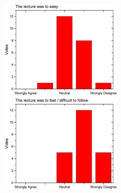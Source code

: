 \begin{figure}[h!]
\begin{minipage}{.48\linewidth}
      {\includegraphics[height=50mm]{figures/n/Graph45.pdf}}
      {\includegraphics[height=50mm]{figures/n/Graph46.pdf}}
  \end{minipage}
\end{figure}

